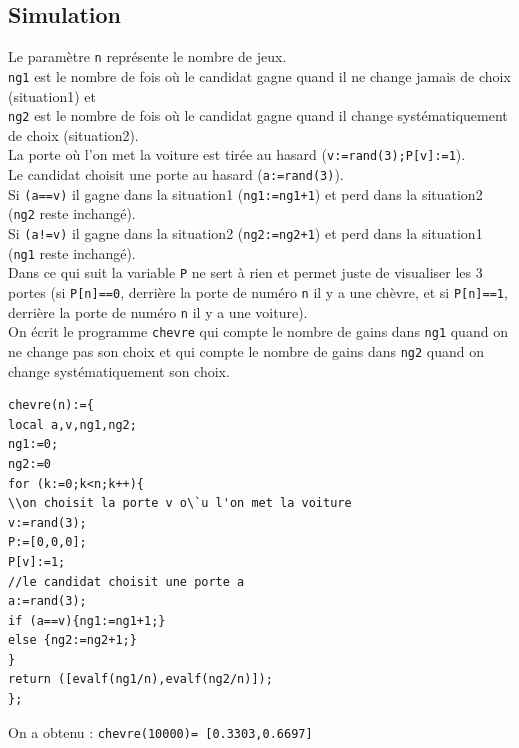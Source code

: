 \documentclass[a4paper,11pt]{book}
\begin{document}
\subsection{Simulation}
Le param\`etre {\tt n} repr\'esente le nombre de jeux.\\
{\tt ng1} est le nombre de fois o\`u le candidat gagne quand il ne change 
jamais de choix (situation1) et \\
{\tt ng2} est le nombre de fois o\`u le candidat gagne quand il change 
syst\'ematiquement de choix (situation2).\\
La porte o\`u l'on met la voiture est tir\'ee au hasard 
({\tt v:=rand(3);P[v]:=1}).\\
Le candidat choisit une porte au hasard ({\tt a:=rand(3)}).\\
Si {\tt (a==v)} il gagne dans la situation1 ({\tt ng1:=ng1+1}) et perd dans la 
situation2 ({\tt ng2} reste inchang\'e).\\
Si {\tt (a!=v)} il gagne dans la situation2 ({\tt ng2:=ng2+1}) et perd dans la 
situation1 ({\tt ng1} reste inchang\'e).\\
Dans ce qui suit la variable {\tt P} ne sert \`a rien et permet juste de 
visualiser les 3 portes (si  {\tt P[n]==0}, derri\`ere la porte de num\'ero 
{\tt  n} il y a une ch\`evre, et si {\tt P[n]==1}, derri\`ere la porte de 
num\'ero {\tt  n} il y a une voiture). \\
On \'ecrit le programme {\tt chevre} qui compte le nombre de gains dans
{\tt ng1} quand on ne change pas son choix et 
qui compte le nombre de gains dans
{\tt ng2} quand on change syst\'ematiquement son choix.
\begin{verbatim}
chevre(n):={
local a,v,ng1,ng2;
ng1:=0;
ng2:=0
for (k:=0;k<n;k++){
\\on choisit la porte v o\`u l'on met la voiture
v:=rand(3);
P:=[0,0,0];
P[v]:=1;
//le candidat choisit une porte a
a:=rand(3);
if (a==v){ng1:=ng1+1;}
else {ng2:=ng2+1;}
}
return ([evalf(ng1/n),evalf(ng2/n)]);
};
\end{verbatim} 
On a obtenu :
{\tt chevre(10000)= [0.3303,0.6697]}
\end{document}
